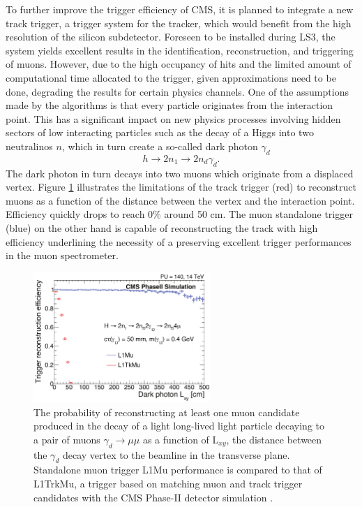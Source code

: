     To further improve the trigger efficiency of CMS, it is planned to integrate a new track trigger, a trigger system for the tracker, which would benefit from the high resolution of the silicon subdetector. Foreseen to be installed during LS3, the system yields excellent results in the identification, reconstruction, and triggering of muons. However, due to the high occupancy of hits and the limited amount of computational time allocated to the trigger, given approximations need to be done, degrading the results for certain physics channels. One of the assumptions made by the algorithms is that every particle originates from the interaction point. This has a significant impact on new physics processes involving hidden sectors of low interacting particles such as the decay of a Higgs into two neutralinos $ n $, which in turn create a so-called dark photon $ \gamma_d $
    \begin{equation}
      h \rightarrow 2 n_1 \rightarrow 2 n_d \gamma_d .
    \end{equation}
    The dark photon in turn decays into two muons which originate from a displaced vertex. Figure \ref{fig:II-1-dark-photon} illustrates the limitations of the track trigger (red) to reconstruct muons as a function of the distance between the vertex and the interaction point. Efficiency quickly drops to reach 0\% around 50 cm. The muon standalone trigger (blue) on the other hand is capable of reconstructing the track with high efficiency underlining the necessity of a preserving excellent trigger performances in the muon spectrometer.

    \begin{figure}[h!]
      \centering
      \includegraphics[width=0.6\textwidth]{img/II-1-gem/dark-photon.pdf}
      \caption{The probability of reconstructing at least one muon candidate produced in the decay of a light long-lived light particle decaying to a pair of muons $\gamma_d \rightarrow \mu \mu $ as a function of L$_{xy}$, the distance between the $\gamma_d$ decay vertex to the beamline in the transverse plane. Standalone muon trigger L1Mu performance is compared to that of L1TrkMu, a trigger based on matching muon and track trigger candidates with the CMS Phase-II detector simulation \cite{Colaleo:2021453}.}
      \label{fig:II-1-dark-photon}
    \end{figure}


